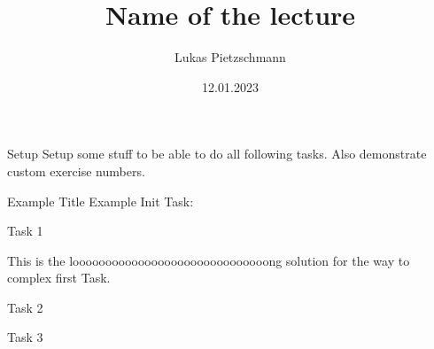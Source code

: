 \documentclass[english, uulm, solution]{exercise}
\title{Name of the lecture}
\author{Lukas Pietzschmann}
\institute{The best institute ever}
\date{12.01.2023}
\begin{document}
	\maketitle

	\begin{exercise}[Exercise 0]{Setup}
		Setup some stuff to be able to do all following tasks. Also demonstrate custom exercise numbers.
	\end{exercise}

	\begin{exercise}{Example Title}
		Example Init Task:
		\begin{tasks}
			\item Task 1
				\begin{solution}
					This is the loooooooooooooooooooooooooooooong solution for the way to complex first Task.
				\end{solution}
			\item Task 2
			\item Task 3
		\end{tasks}
	\end{exercise}
\end{document}
